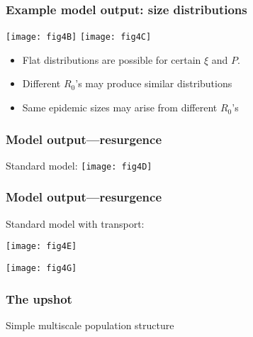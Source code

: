 \begin{frame}
  \frametitle{Example model output: size distributions}

  \texttt{[image: fig4B]}
  \texttt{[image: fig4C]}

  \begin{itemize}
  \item<3-> Flat distributions are possible for certain $\xi$ and $P$.
  \item<4-> Different $R_0$'s may produce similar distributions
  \item<5-> Same epidemic sizes may arise from different $R_0$'s
  \end{itemize}

\end{frame}

\begin{frame}
  \frametitle{Model output---resurgence}

   \alert{Standard model:}
   \bigskip
   \bigskip
   \texttt{[image: fig4D]}


\end{frame}

\begin{frame}
  \frametitle{Model output---resurgence}

    \alert{Standard model with transport:}
    \bigskip

    \texttt{[image: fig4E]} 

    \texttt{[image: fig4G]} 

\end{frame}

\begin{frame}
  \frametitle{The upshot}

  \alert{Simple multiscale population structure}\\

\end{frame}

